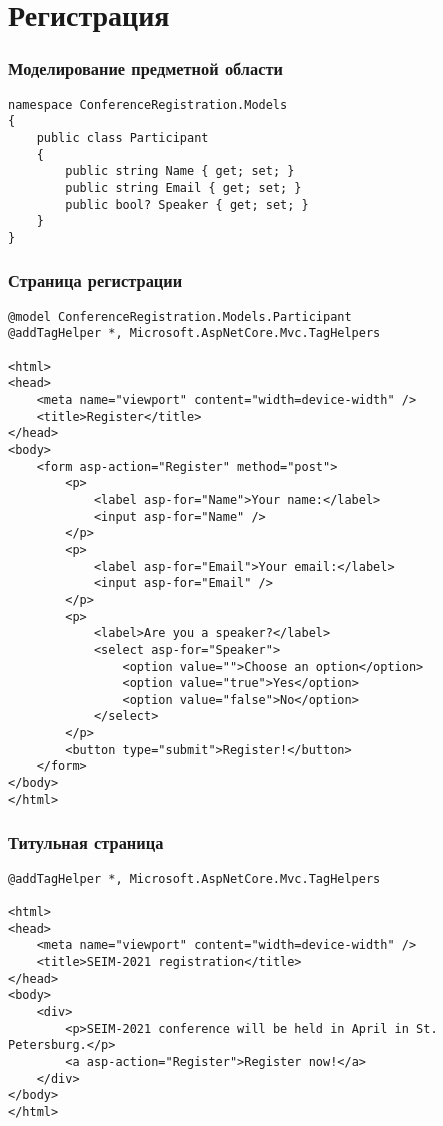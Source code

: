 \documentclass[xetex,mathserif,serif]{beamer}
\begin{document}
    \section{Регистрация}

    \begin{frame}[fragile]
        \frametitle{Моделирование предметной области}
        \begin{verbatim}
namespace ConferenceRegistration.Models
{
    public class Participant
    {
        public string Name { get; set; }
        public string Email { get; set; }
        public bool? Speaker { get; set; }
    }
}
        \end{verbatim}
    \end{frame}

    \begin{frame}[fragile]
        \frametitle{Страница регистрации}
        \begin{ssmall}
            \begin{verbatim}
@model ConferenceRegistration.Models.Participant
@addTagHelper *, Microsoft.AspNetCore.Mvc.TagHelpers

<html>
<head>
    <meta name="viewport" content="width=device-width" />
    <title>Register</title>
</head>
<body>
    <form asp-action="Register" method="post">
        <p>
            <label asp-for="Name">Your name:</label>
            <input asp-for="Name" />
        </p>
        <p>
            <label asp-for="Email">Your email:</label>
            <input asp-for="Email" />
        </p>
        <p>
            <label>Are you a speaker?</label>
            <select asp-for="Speaker">
                <option value="">Choose an option</option>
                <option value="true">Yes</option>
                <option value="false">No</option>
            </select>
        </p>
        <button type="submit">Register!</button>
    </form>
</body>
</html>
            \end{verbatim}
        \end{ssmall}
    \end{frame}

    \begin{frame}[fragile]
        \frametitle{Титульная страница}
        \begin{verbatim}
@addTagHelper *, Microsoft.AspNetCore.Mvc.TagHelpers

<html>
<head>
    <meta name="viewport" content="width=device-width" />
    <title>SEIM-2021 registration</title>
</head>
<body>
    <div>
        <p>SEIM-2021 conference will be held in April in St. Petersburg.</p>
        <a asp-action="Register">Register now!</a>
    </div>
</body>
</html>
        \end{verbatim}
    \end{frame}
\end{document}
